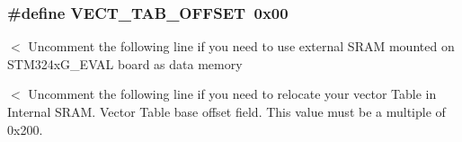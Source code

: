 \subsubsection[{\texorpdfstring{V\+E\+C\+T\+\_\+\+T\+A\+B\+\_\+\+O\+F\+F\+S\+ET}{VECT_TAB_OFFSET}}]{\setlength{\rightskip}{0pt plus 5cm}\#define V\+E\+C\+T\+\_\+\+T\+A\+B\+\_\+\+O\+F\+F\+S\+ET~0x00}\hypertarget{group___s_t_m32_f4xx___system___private___defines_ga40e1495541cbb4acbe3f1819bd87a9fe}{}\label{group___s_t_m32_f4xx___system___private___defines_ga40e1495541cbb4acbe3f1819bd87a9fe}
$<$ Uncomment the following line if you need to use external S\+R\+AM mounted on S\+T\+M324x\+G\+\_\+\+E\+V\+AL board as data memory

$<$ Uncomment the following line if you need to relocate your vector Table in Internal S\+R\+AM. Vector Table base offset field. This value must be a multiple of 0x200. 